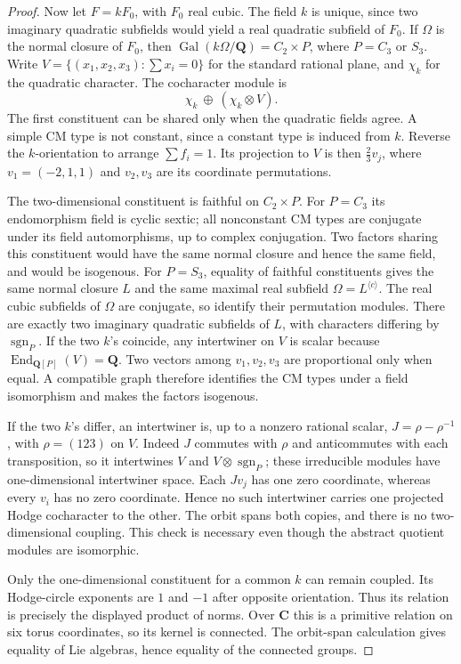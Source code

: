 \documentclass[10pt,reqno]{article}
\theoremstyle{emphasizedplain}
\theoremstyle{emphasizeddefinition}
\theoremstyle{emphasizeddefinition}
\DeclareMathOperator{\End}{End}
\newcommand{\Q}{\mathbf Q}
\newcommand{\C}{\mathbf C}
\begin{document}
\begin{proof}
Now let $F=kF_0$, with $F_0$ real cubic. The field $k$ is unique,
since two imaginary quadratic subfields would yield a real quadratic
subfield of $F_0$. If $\Omega$ is the normal closure of $F_0$, then
$\operatorname{Gal}(k\Omega/\Q)=C_2\times P$, where
$P=C_3$ or $S_3$. Write $V=\{(x_1,x_2,x_3):\sum x_i=0\}$ for the
standard rational plane, and $\chi_k$ for the quadratic character.
The cocharacter module is
\[
 \chi_k\ \oplus\ (\chi_k\otimes V).
\]
The first constituent can be shared only when the quadratic fields
agree. A simple CM type is not constant, since a constant type is
induced from $k$. Reverse the $k$-orientation to arrange $\sum f_i=1$.
Its projection to $V$ is then $\frac23 v_j$, where
$v_1=(-2,1,1)$ and $v_2,v_3$ are its coordinate permutations.

The two-dimensional constituent is faithful on $C_2\times P$.
For $P=C_3$ its endomorphism field is cyclic sextic; all nonconstant
CM types are conjugate under its field automorphisms, up to complex
conjugation. Two factors sharing this constituent would have the same
normal closure and hence the same field, and would be isogenous.
For $P=S_3$, equality of faithful constituents gives the same normal
closure $L$ and the same maximal real subfield $\Omega=L^{\langle c\rangle}$.
The real cubic subfields of $\Omega$ are conjugate, so identify their
permutation modules. There are exactly two imaginary quadratic
subfields of $L$, with characters differing by $\operatorname{sgn}_P$.
If the two $k$'s coincide, any intertwiner on $V$ is scalar because
$\End_{\Q[P]}(V)=\Q$. Two vectors among $v_1,v_2,v_3$ are proportional
only when equal. A compatible graph therefore identifies the CM types
under a field isomorphism and makes the factors isogenous.

If the two $k$'s differ, an intertwiner is, up to a nonzero rational
scalar, $J=\rho-\rho^{-1}$, with $\rho=(123)$ on $V$.
Indeed $J$ commutes with $\rho$ and anticommutes with each
transposition, so it intertwines $V$ and $V\otimes\operatorname{sgn}_P$;
these irreducible modules have one-dimensional intertwiner space.
Each $Jv_j$ has one zero coordinate, whereas every $v_i$ has no zero
coordinate. Hence no such intertwiner carries one projected Hodge
cocharacter to the other. The orbit spans both copies, and there is
no two-dimensional coupling. This check is necessary even though the
abstract quotient modules are isomorphic.

Only the one-dimensional constituent for a common $k$ can remain
coupled. Its Hodge-circle exponents are $1$ and $-1$ after opposite
orientation. Thus its relation is precisely the displayed product of
norms. Over $\C$ this is a primitive relation on six torus coordinates,
so its kernel is connected. The orbit-span calculation gives equality
of Lie algebras, hence equality of the connected groups.
\end{proof}
\end{document}
